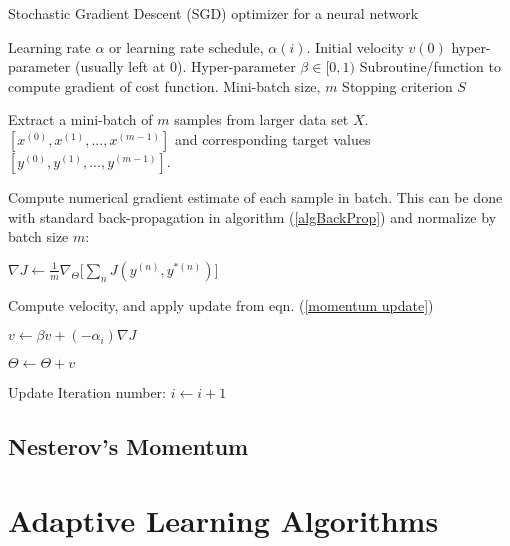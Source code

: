 \documentclass[12pt,letterpaper]{article}
\begin{document}
\begin{algorithm}
\caption{Stochastic Gradient Descent (SGD) optimizer for a neural network}
\label{algSGD}

\begin{algorithmic}

\REQUIRE Learning rate $\alpha$ or learning rate schedule, $\alpha(i)$.
\REQUIRE Initial velocity $v(0)$ hyper-parameter (usually left at $0$).
\REQUIRE Hyper-parameter $\beta \in [0,1)$
\REQUIRE Subroutine/function to compute gradient of cost function.
\REQUIRE Mini-batch size, $m$
\REQUIRE Stopping criterion $S$

	\item Extract a mini-batch of $m$ samples from larger data set $X$. $[x^{(0)},x^{(1)},...,x^{(m-1)}]$ and corresponding target values 
	$[y^{(0)},y^{(1)},...,y^{(m-1)}]$.
	\item Compute numerical gradient estimate of each sample in batch. This can be done with standard back-propagation in algorithm (\ref{algBackProp}) and 			 	normalize by batch size $m$:
	\item $\nabla J \leftarrow \frac{1}{m}\nabla_{\Theta} \Big[ \sum_n J(y^{(n)},y^{*(n)}) \Big] $
	\item Compute velocity, and apply update from eqn. (\ref{momentum update})
	\item $v \leftarrow \beta v + (-\alpha_i)\nabla J$
	\item $\Theta \leftarrow \Theta + v$
	\item Update Iteration number: $i \leftarrow i + 1$
\ENDWHILE

\end{algorithmic}
\end{algorithm}

\subsection{Nesterov's Momentum}

\paragraph*{}



\section{Adaptive Learning Algorithms}
\end{document}
